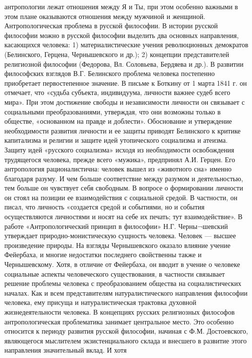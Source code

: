 \documentclass[12pt]{article}
\begin{document}
антропологии  лежат  отношения  между  Я  и  Ты,  при  этом  особенно  важными  в  этом  плане  оказываются
отношения между мужчиной и женщиной.
Антропологическая проблема в русской философии.
В истории русской философии можно в русской философии выделить два основных направления, касающихся
человека:
1) материалистические учения революционных демократов (Белинского, Герцена, Чернышевского и др.);
2) концепции представителей религиозной философии (Федорова, Вл. Соловьева, Бердяева и др.).
В развитии философских взглядов В.Г. Белинского проблема человека постепенно приобретает первостепенное
значение. В письме к Боткину от 1 марта 1841 г. он отмечает, что «судьба субъекта, индивидуума, личности  
важнее  судеб  всего  мира».  При  этом  достижение  свободы  и  независимости  личности  он  связывает  с
социальными преобразованиями, утверждая, что они возможны только в обществе, «основанном на правде и
доблести». Обоснование и утверждение необходимости развития личности и ее защиты приводят Белинского к
критике капитализма и религии и защите идей утопического социализма и атеизма.
Защиту идей «русского социализма» исходя из необходимости освобождения трудящегося человека, прежде
всего «мужика», предпринял А.И. Герцен. Его антропология рационалистична: человек вышел из «животного
сна» именно благодаря разуму. И чем больше соответствие между разумом и деятельностью, тем больше он
чувствует себя свободным. В вопросе о формировании личности он стоял на позиции ее взаимодействия с
социальной  средой.  В  частности,  он  писал,  что  личность  «создается  средой  и  событиями,  но  и  события
осуществляются личностями и носят на себе их печать; тут взаимодействие».
В  работе  «Антропологический  принцип  в  философии»  Н.Г.  Черны¬шевский  утверждает  природно-монистическую сущность человека. Человек — высшее произведение природы. На взгляды Чернышевского
оказало влияние учение Фейербаха, и многие недостатки последнего свойственны также и Чернышевскому.
Хотя,  в  отличие  от  Фейербаха,  он  вводит  в  учение  о  человеке  социальные  аспекты  человеческого
существования,  в  частности  связывает  решение  проблемы  человека  с  преобразованием  общества  на
социалистических началах. Как и всем представителям натуралистического направления философии человека,
ему присуща и натуралистическая трактовка духовной жизнедеятельности человека.
В концепциях русских религиозных философов антропологическая проблематика занимает центральное место.
Это особенно относится к периоду развития русской философии, начиная с Ф.М. Достоевского, являющегося
мыслителем экзистенциального склада и внесшего в развитие этого направления значительный вклад. И хотя
\end{document}
